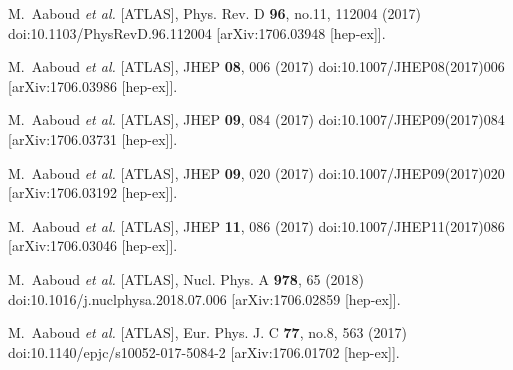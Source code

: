 \begin{thebibliography}{9}
M.~Aaboud \textit{et al.} [ATLAS],
Phys. Rev. D \textbf{96}, no.11, 112004 (2017)
doi:10.1103/PhysRevD.96.112004
[arXiv:1706.03948 [hep-ex]].

M.~Aaboud \textit{et al.} [ATLAS],
JHEP \textbf{08}, 006 (2017)
doi:10.1007/JHEP08(2017)006
[arXiv:1706.03986 [hep-ex]].

M.~Aaboud \textit{et al.} [ATLAS],
JHEP \textbf{09}, 084 (2017)
doi:10.1007/JHEP09(2017)084
[arXiv:1706.03731 [hep-ex]].

M.~Aaboud \textit{et al.} [ATLAS],
JHEP \textbf{09}, 020 (2017)
doi:10.1007/JHEP09(2017)020
[arXiv:1706.03192 [hep-ex]].

M.~Aaboud \textit{et al.} [ATLAS],
JHEP \textbf{11}, 086 (2017)
doi:10.1007/JHEP11(2017)086
[arXiv:1706.03046 [hep-ex]].

M.~Aaboud \textit{et al.} [ATLAS],
Nucl. Phys. A \textbf{978}, 65 (2018)
doi:10.1016/j.nuclphysa.2018.07.006
[arXiv:1706.02859 [hep-ex]].

M.~Aaboud \textit{et al.} [ATLAS],
Eur. Phys. J. C \textbf{77}, no.8, 563 (2017)
doi:10.1140/epjc/s10052-017-5084-2
[arXiv:1706.01702 [hep-ex]].


\end{thebibliography}
